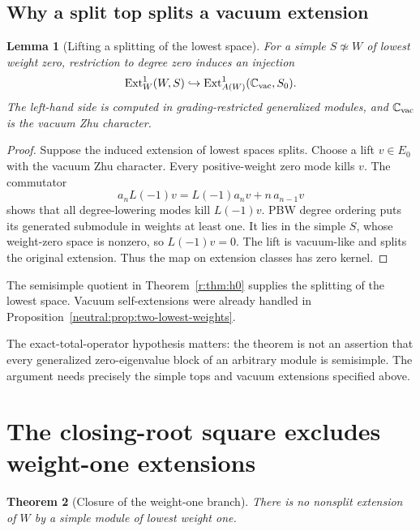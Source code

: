 \documentclass[11pt,a4paper]{article}
\numberwithin{equation}{section}
\newtheorem{theorem}{Theorem}[section]
\newtheorem{lemma}[theorem]{Lemma}
\theoremstyle{definition}\newtheorem{definition}[theorem]{Definition}
\theoremstyle{remark}\newtheorem{remark}[theorem]{Remark}
\newcommand{\C}{\mathbb C}\newcommand{\Z}{\mathbb Z}\newcommand{\Q}{\mathbb Q}
\begin{document}
\subsection{Why a split top splits a vacuum extension}

\begin{lemma}[Lifting a splitting of the lowest space]
\label{r:lem:lift-top}
For a simple \(S\not\simeq W\) of lowest weight zero, restriction to
degree zero induces an injection
\[
 \Ext_W^1(W,S)\hookrightarrow
 \Ext_{A(W)}^1(\C_{\rm vac},S_0).
\]
The left-hand side is computed in grading-restricted generalized
modules, and \(\C_{\rm vac}\) is the vacuum Zhu character.
\end{lemma}

\begin{proof}
Suppose the induced extension of lowest spaces splits.  Choose a lift
\(v\in E_0\) with the vacuum Zhu character. Every
positive-weight zero mode kills \(v\). The commutator
\[
 a_nL(-1)v=L(-1)a_nv+n\,a_{n-1}v
\]
shows that all degree-lowering modes kill \(L(-1)v\).
PBW degree ordering puts its generated submodule in weights
at least one. It lies in the simple \(S\), whose weight-zero
space is nonzero, so \(L(-1)v=0\). The lift is vacuum-like
and splits the original extension.  Thus the map on extension
classes has zero kernel.
\end{proof}

The semisimple quotient in Theorem~\ref{r:thm:h0} supplies the splitting
of the lowest space.  Vacuum self-extensions were already handled in
Proposition~\ref{neutral:prop:two-lowest-weights}.

The exact-total-operator hypothesis matters: the theorem is
not an assertion that every generalized zero-eigenvalue
block of an arbitrary module is semisimple. The argument
needs precisely the simple tops and vacuum extensions
specified above.

\section{The closing-root square excludes weight-one extensions}
\label{r:sec:h1}

\begin{theorem}[Closure of the weight-one branch]\label{r:thm:h1}
There is no nonsplit extension of \(W\) by a simple module
of lowest weight one.
\end{theorem}
\end{document}
